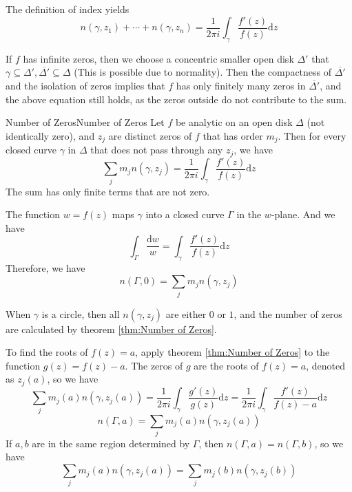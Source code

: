 \documentclass[../main.tex]{subfiles}
\begin{document}
The definition of index yields
\begin{equation}
	n(\gamma,z_1) + \cdots + n(\gamma,z_n) = \frac{1}{2\pi i} \int_{\gamma} \frac{f'(z)}{f(z)} \mathrm{d} z
\end{equation}

If $f$ has infinite zeros, then we choose a concentric smaller open disk $\Delta'$ that $\gamma \subseteq \Delta', \overline{\Delta'} \subseteq \Delta$ (This is possible due to normality). Then the compactness of $\overline{\Delta'}$ and the isolation of zeros implies that $f$ has only finitely many zeros in $\overline{\Delta'}$, and the above equation still holds, as the zeros outside do not contribute to the sum.

\begin{theorem}{Number of Zeros}{Number of Zeros}
	Let $f$ be analytic on an open disk $\Delta$ (not identically zero), and $z_j$ are distinct zeros of $f$ that has order $m_j$. Then for every closed curve $\gamma$ in $\Delta$ that does not pass through any $z_j$, we have
	\begin{equation}
		\sum_{j} m_j n(\gamma,z_j) = \frac{1}{2\pi i} \int_{\gamma} \frac{f'(z)}{f(z)} \mathrm{d} z 
	\end{equation}
	The sum has only finite terms that are not zero.
\end{theorem}
The function $w = f(z)$ maps $\gamma$ into a closed curve $\Gamma$ in the $w$-plane. And we have
\begin{equation*}
	\int_{\Gamma} \frac{\mathrm{d} w}{w} = \int_{\gamma} \frac{f'(z)}{f(z)} \mathrm{d} z
\end{equation*}
Therefore, we have
\begin{equation}
	n(\Gamma,0) = \sum_{j} m_j n(\gamma,z_j)
\end{equation}
\begin{remark}
	When $\gamma$ is a circle, then all $n(\gamma,z_j)$ are either $0$ or $1$, and the number of zeros are calculated by theorem \ref{thm:Number of Zeros}.
\end{remark}

To find the roots of $f(z) = a$, apply theorem \ref{thm:Number of Zeros} to the function $g(z) = f(z) - a$. The zeros of $g$ are the roots of $f(z) = a$, denoted as $z_j(a)$, so we have
\begin{equation}
	\sum_{j} m_j(a) n(\gamma,z_j(a)) = \frac{1}{2\pi i} \int_{\gamma} \frac{g'(z)}{g(z)} \mathrm{d} z = \frac{1}{2\pi i} \int_{\gamma} \frac{f'(z)}{f(z)-a} \mathrm{d} z
\end{equation}
\begin{equation}
	n(\Gamma,a) = \sum_{j} m_j(a) n(\gamma,z_j(a))
\end{equation}
If $a,b$ are in the same region determined by $\Gamma$, then $n(\Gamma,a) = n(\Gamma,b)$, so we have
\begin{equation}
	\sum_{j} m_j(a) n(\gamma,z_j(a)) = \sum_{j} m_j(b) n(\gamma,z_j(b))
\end{equation}
\end{document}
